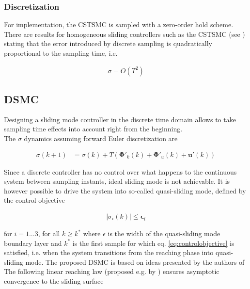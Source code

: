\documentclass{ifacconf}
\providecommand{\mbf}[1]{\mathbf{#1}}
\begin{document}
\subsubsection{Discretization}
For implementation, the CSTSMC is sampled with a zero-order hold scheme. There are results for homogeneous sliding controllers such as the CSTSMC (see \cite{shtessel2014sliding}) stating that the error introduced by discrete sampling is quadratically proportional to the sampling time, i.e.

\begin{align}
\sigma = O(T^2)
\end{align}


\subsection{DSMC}
Designing a sliding mode controller in the discrete time domain allows to take sampling time effects into account right from the beginning. \\
The $\sigma$ dynamics assuming forward Euler discretization are

\begin{align}
{{\sigma}}(k+1)
&= 
{{\sigma}}(k)
+
T(
\mbf{\Phi}'_k(k) + \mbf{\Phi}'_u(k) + \mbf{u}'(k))
\label{eq:sigmadyndiscrete}
\end{align}

Since a discrete controller has no control over what happens to the continuous system between sampling instants, ideal sliding mode is not achievable. It is however possible to drive the system into so-called quasi-sliding mode, defined by the control objective 

\begin{align}
|{\sigma}_i(k)| \leq \mbf{\epsilon}_i
\label{eq:controlobjective}
\end{align}

for $i=1...3$, for all $k \geq k^*$ where $\epsilon$ is the width of the quasi-sliding mode boundary layer and $k^*$ is the first sample for which eq. \ref{eq:controlobjective} is satisfied, i.e. when the system transitions from the reaching phase into quasi-sliding mode.
The proposed DSMC is based on ideas presented by the authors of \cite{monsees2001discrete}
The following linear reaching law (proposed e.g. by \cite{Spurgeon1992}) ensures asymptotic convergence to the sliding surface
\end{document}
